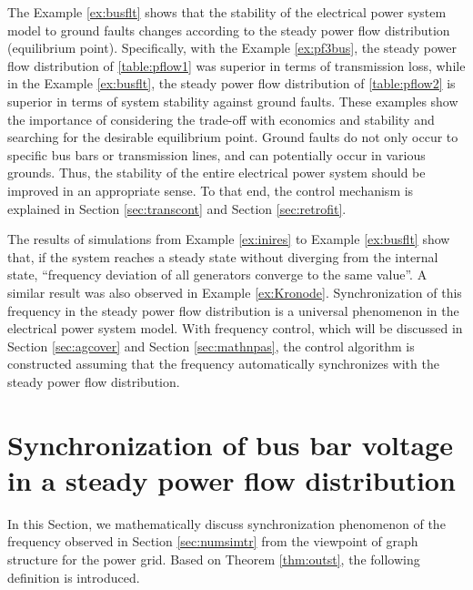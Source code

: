 \documentclass[graybox, envcountchap]{svmult}
\begin{document}
The Example \ref{ex:busflt} shows that the stability of the electrical power system model to ground faults changes according to the steady power flow distribution (equilibrium point).
Specifically, with the Example \ref{ex:pf3bus}, the steady power flow distribution of \ref{table:pflow1} was superior in terms of transmission loss, while in the Example \ref{ex:busflt}, the steady power flow distribution of \ref{table:pflow2} is superior in terms of system stability against ground faults.
These examples show the importance of considering the trade-off with economics and stability and searching for the desirable equilibrium point.
Ground faults do not only occur to specific bus bars or transmission lines, and can potentially occur in various grounds. Thus, the stability of the entire electrical power system should be improved in an appropriate sense.
To that end, the control mechanism is explained in Section \ref{sec:transcont} and Section \ref{sec:retrofit}.

The results of simulations from Example \ref{ex:inires} to Example \ref{ex:busflt} show that, if the system reaches a steady state without diverging from the internal state, “frequency deviation of all generators converge to the same value”.
A similar result was also observed in Example \ref{ex:Kronode}. Synchronization of this frequency in the steady power flow distribution is a universal phenomenon in the electrical power system model.
With frequency control, which will be discussed in Section \ref{sec:agcover} and Section \ref{sec:mathnpas}, the control algorithm is constructed assuming that the frequency automatically synchronizes with the steady power flow distribution.

\section{Synchronization of bus bar voltage in a steady power flow distribution\advanced}\label{sec:phsync}

In this Section, we mathematically discuss synchronization phenomenon of the frequency observed in Section \ref{sec:numsimtr} from the viewpoint of graph structure for the power grid.
Based on Theorem \ref{thm:outst}, the following definition is introduced.
\end{document}
